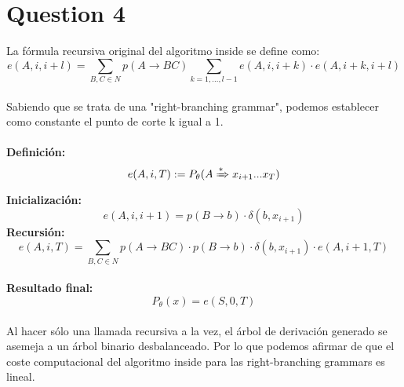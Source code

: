 \documentclass[12pt]{article}
\begin{document}
\section*{Question 4}
La fórmula recursiva original del algoritmo inside se define como:
\begin{equation*}
    e(A,i,i+l) = \sum\limits_{B, C \in N} p(A \to BC) \sum\limits_{k = 1, ... , l-1} e(A,i,i+k) \cdot e(A,i+k,i+l)
\end{equation*}
\\
Sabiendo que se trata de una "right-branching grammar", podemos establecer como constante el punto de corte k igual a 1.\\\\
\textbf{Definición:} 
\begin{equation*}
    e(A,i,T) := P_{\theta}(A \xRightarrow{*}  x_{i+1} ... x_{T})
\end{equation*}
\textbf{Inicialización:}
\\
\begin{equation*}
    e(A,i, i+1) = p(B \to b) \cdot \delta(b, x_{i+1})
\end{equation*}
\textbf{Recursión:}
\\
\begin{equation*}
    e(A,i,T) = \sum\limits_{B, C \in N} p(A \to BC) \cdot p(B \to b) \cdot \delta(b, x_{i+1}) \cdot e(A,i+1, T)
\end{equation*}
\\
\textbf{Resultado final:}
\\
\begin{equation*}
   P_{\theta}(x) = e(S,0,T)
\end{equation*}
\\
Al hacer sólo una llamada recursiva a la vez, el árbol de derivación generado se asemeja a un árbol binario desbalanceado. Por lo que podemos afirmar de que el coste computacional del algoritmo inside para las right-branching grammars es lineal.
\\
\newpage
\end{document}
